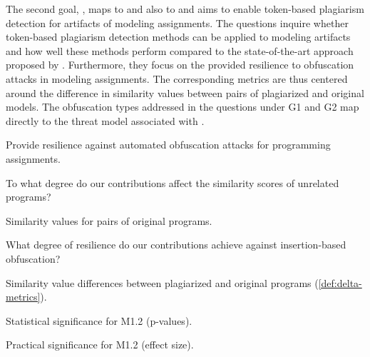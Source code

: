 The second goal, , maps to  and also to  and aims to enable token-based plagiarism detection for artifacts of modeling assignments. The questions inquire whether token-based plagiarism detection methods can be applied to modeling artifacts and how well these methods perform compared to the state-of-the-art approach proposed by \citet{Martinez2020}. Furthermore, they focus on the provided resilience to obfuscation attacks in modeling assignments.
The corresponding metrics are thus centered around the difference in similarity values between pairs of plagiarized and original models.
%
The obfuscation types addressed in the questions under G1 and G2 map directly to the threat model associated with .

\clearpage
\begin{description}\label{main-gqm}
    \label{gqm-plan}
    \item[\large{Goal-Question-Metric Plan:}]
    \normalsize
    \item[G1] Provide resilience against automated obfuscation attacks for programming assignments.
        \begin{description}[style=unboxed]
            \footnotesize
            \item[Q1.1] To what degree do our contributions affect the similarity scores of unrelated programs?
                \begin{description}[style=unboxed]
                    \footnotesize
                    \item[M1.1] Similarity values for pairs of original programs.
                \end{description}
            \item[Q1.2] What degree of resilience do our contributions achieve against insertion-based obfuscation?
                \begin{description}[style=unboxed]
                    \footnotesize
                    \item[M1.2] Similarity value differences between plagiarized and original programs (\autoref{def:delta-metrics}).
                    \item[M1.3] Statistical significance for M1.2 (p-values).
                    \item[M1.4] Practical significance for M1.2 (effect size).
                \end{description}

\end{description}
\end{description}
